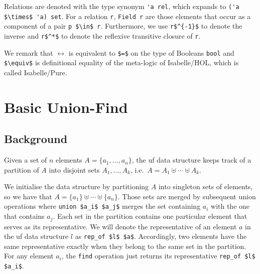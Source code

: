 \documentclass[
  sigplan,
  10pt,
  anonymous,
  review,
  ]{acmart}
\newcommand{\opunion}{union}
\begin{document}
Relations are denoted with the type synonym \lstinline|'a rel|, which expands to \lstinline|('a $\times$ 'a) set|.
For a relation \lstinline|r|, \lstinline|Field r| are those elements that occur as a component of a pair \lstinline|p $\in$ r|.
Furthermore, we use \lstinline|r$^{-1}$| to denote the inverse and \lstinline|r$^*$| to denote the reflexive transitive closure of \lstinline|r|.

We remark that $\longleftrightarrow$ is equivalent to \lstinline!$=$! on the type of Booleans \lstinline!bool! and \lstinline!$\equiv$! is definitional equality of the meta-logic of Isabelle/HOL, which is called Isabelle/Pure.

\section{Basic Union-Find}
\subsection{Background\label{sec:uf_background}}
Given a set of $n$ elements $A = \{a_1, \ldots, a_n\}$, the \acrfull{uf} data structure keeps track of a partition of $A$ into disjoint sets $A_1, \ldots, A_k$, i.e.\ $A = A_1 \uplus \cdots \uplus A_k$.

We initialise the data structure by partitioning $A$ into singleton sets of elements,
so we have that $A = \{a_1\} \uplus \cdots \uplus \{a_n\}$.
Those sets are merged by subsequent \opunion{} operations where \lstinline!union $a_i$ $a_j$! merges the set containing $a_i$ with the one that contains $a_j$.
Each set in the partition contains one particular element that serves as its representative.
We will denote the representative of an element $a$ in the \acrshort{uf} data structure $l$ as \lstinline!rep_of $l$ $a$!.
Accordingly, two elements have the same representative exactly when they belong to the same set in the partition.
For any element $a_i$, the \lstinline!find! operation just returns its representative \lstinline!rep_of $l$ $a_i$!.
\end{document}
